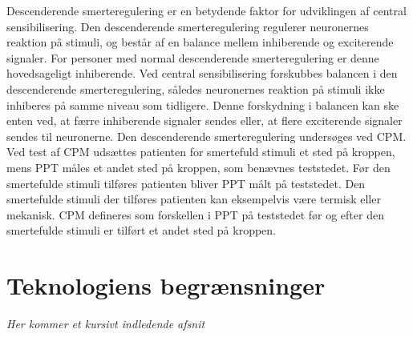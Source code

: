 Descenderende smerteregulering er en betydende faktor for udviklingen af central sensibilisering. Den descenderende smerteregulering regulerer neuronernes reaktion på stimuli, og består af en balance mellem inhiberende og exciterende signaler. For personer med normal descenderende smerteregulering er denne hovedsageligt inhiberende. Ved central sensibilisering forskubbes balancen i den descenderende smerteregulering, således neuronernes reaktion på stimuli ikke inhiberes på samme niveau som tidligere. Denne forskydning i balancen kan ske enten ved, at færre inhiberende signaler sendes eller, at flere exciterende signaler sendes til neuronerne. \citep{Arendt-Nielsen2015b} Den descenderende smerteregulering undersøges ved CPM. Ved test af CPM udsættes patienten for smertefuld stimuli et sted på kroppen, mens PPT måles et andet sted på kroppen, som benævnes teststedet. Før den smertefulde stimuli tilføres patienten bliver PPT målt på teststedet. \citep{Petersen2016} Den smertefulde stimuli der tilføres patienten kan eksempelvis være termisk eller mekanisk. CPM defineres som forskellen i PPT på teststedet før og efter den smertefulde stimuli er tilført et andet sted på kroppen. \citep{Petersen2015b} 
\section{Teknologiens begrænsninger}
\textit{Her kommer et kursivt indledende afsnit}

